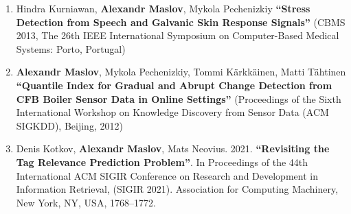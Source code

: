 \begin{enumerate}[leftmargin=0.2cm]
  \item Hindra Kurniawan, \textbf{Alexandr Maslov}, Mykola Pechenizkiy \textbf{``Stress Detection from Speech and Galvanic Skin Response Signals''} (CBMS 2013, The 26th IEEE International Symposium on Computer-Based Medical Systems: Porto, Portugal)

  \item \textbf{Alexandr Maslov}, Mykola Pechenizkiy, Tommi K\"{a}rkk\"{a}inen, Matti T\"{a}htinen
\textbf{``Quantile Index for Gradual and Abrupt Change Detection from CFB Boiler Sensor Data in Online Settings''}
(Proceedings of the Sixth International Workshop on Knowledge Discovery from Sensor Data (ACM SIGKDD), Beijing, 2012)


  \item Denis Kotkov, \textbf{Alexandr Maslov}, Mats Neovius. 2021. \textbf{``Revisiting the Tag Relevance Prediction Problem''}. In Proceedings of the 44th International ACM SIGIR Conference on Research and Development in Information Retrieval, (SIGIR 2021). Association for Computing Machinery, New York, NY, USA, 1768–1772. %
\end{enumerate}




